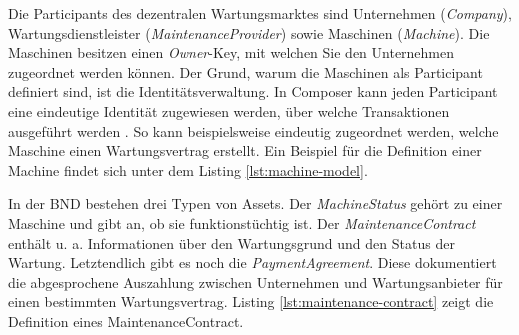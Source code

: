 Die Participants des dezentralen Wartungsmarktes sind Unternehmen (\textit{Company}), Wartungsdienstleister (\textit{MaintenanceProvider}) sowie Maschinen (\textit{Machine}). Die Maschinen besitzen einen \textit{Owner}-Key, mit welchen Sie den Unternehmen zugeordnet werden können. Der Grund, warum die Maschinen als Participant definiert sind, ist die Identitätsverwaltung. In Composer kann jeden Participant eine eindeutige Identität zugewiesen werden, über welche Transaktionen ausgeführt werden \cite{HyperledgerComposerTeamParticipantsidentitiesHyperledger}. So kann beispielsweise eindeutig zugeordnet werden, welche Maschine einen Wartungsvertrag erstellt. Ein Beispiel für die Definition einer Machine findet sich unter dem Listing \ref{lst:machine-model}.


In der \acs{BND} bestehen drei Typen von Assets. Der \textit{MachineStatus} gehört zu einer Maschine und gibt an, ob sie funktionstüchtig ist. Der \textit{MaintenanceContract} enthält u. a. Informationen über den Wartungsgrund und den Status der Wartung. Letztendlich gibt es noch die \textit{PaymentAgreement}. Diese dokumentiert die abgesprochene Auszahlung zwischen Unternehmen und Wartungsanbieter für einen bestimmten Wartungsvertrag. Listing \ref{lst:maintenance-contract} zeigt die Definition eines MaintenanceContract.


